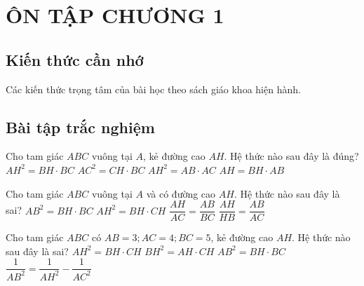 \section{ÔN TẬP CHƯƠNG 1}
\subsection{Kiến thức cần nhớ}
Các kiến thức trọng tâm của bài học theo sách giáo khoa hiện hành. 
\subsection{Bài tập trắc nghiệm}
\begin{bt}%
	Cho tam giác $ABC$ vuông tại $A$, kẻ đường cao $AH$. Hệ thức nào sau đây là đúng?
	\choice
	{$AH^2=BH\cdot BC$}
	{\True $AC^2=CH\cdot BC$}
	{$AH^2=AB\cdot AC$}
	{$AH=BH\cdot  AB$}
\end{bt}
\begin{bt}%
	Cho tam giác $ABC$ vuông tại $A$ và có đường cao $AH$. Hệ thức nào sau đây là sai?
	\choice
	{$AB^2=BH\cdot BC$}
	{$AH^2=BH\cdot CH$}
	{$\dfrac{AH}{AC}=\dfrac{AB}{BC}$}
	{\True $\dfrac{AH}{HB}=\dfrac{AB}{AC}$}
\end{bt}
\begin{bt}%
	Cho tam giác $ABC$ có $AB=3;AC=4;BC=5$, kẻ đường cao $AH$. Hệ thức nào sau đây là sai?
	\choice
	{$AH^2=BH\cdot CH$}
	{\True $BH^2=AH\cdot CH$}
	{$AB^2=BH\cdot BC$}
	{$\dfrac{1}{AB^2}=\dfrac{1}{AH^2}-\dfrac{1}{AC^2}$}
\end{bt}
